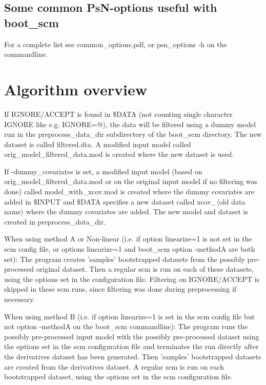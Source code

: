 \subsection{Some common PsN-options useful with boot\_scm}
For a complete list see common\_options.pdf, or psn\_options -h on the commandline.

\begin{optionlist}

\end{optionlist}

\section{Algorithm overview}

If IGNORE/ACCEPT is found in \$DATA (not counting single character IGNORE like e.g. IGNORE=@), 
the data will be filtered using a dummy model run in the preprocess\_data\_dir subdirectory of the boot\_scm directory. The new dataset is called
 filtered.dta. A modified input model called orig\_model\_filtered\_data.mod is created where the new dataset is used.

If -dummy\_covariates is set, a modified input model (based on orig\_model\_filtered\_data.mod or on the original input model if no filtering was done) 
called model\_with\_xcov.mod is created where the dummy covariates are added in \$INPUT and \$DATA specifies a new dataset called xcov\_$\langle$old 
data name$\rangle$ where the dummy covariates are added. The new model and dataset is created in preprocess\_data\_dir. 

When using method A or Non-linear (i.e. if option linearize=1 is not set in the scm config file, 
or options linearize=1 and boot\_scm option -methodA are both set): The program creates 'samples' bootstrapped datasets from the possibly pre-processed 
original dataset. Then a regular scm is run on each of these datasets, using the options set in the configuration file. Filtering on IGNORE/ACCEPT is skipped 
in these scm runs, since filtering was done during preprocessing if necessary. 

When using method B (i.e. if option linearize=1 is set in the scm config file but not option -methodA on the boot\_scm commandline): 
The program runs the possibly pre-processed input model with the possibly pre-processed dataset using the options set in the scm configuration 
file and terminates the run directly after the derivatives dataset has been generated. Then 'samples' bootstrapped datasets are created from the 
derivatives dataset. 
A regular scm is run on each bootstrapped dataset, using the options set in the scm configuration file. 


